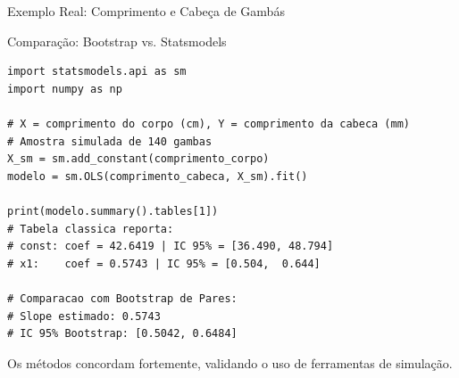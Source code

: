 \begin{frame}[fragile]{Exemplo Real: Comprimento e Cabeça de Gambás}
    \begin{block}{Comparação: Bootstrap vs. Statsmodels}
\begin{lstlisting}
import statsmodels.api as sm
import numpy as np

# X = comprimento do corpo (cm), Y = comprimento da cabeca (mm)
# Amostra simulada de 140 gambas
X_sm = sm.add_constant(comprimento_corpo)
modelo = sm.OLS(comprimento_cabeca, X_sm).fit()

print(modelo.summary().tables[1])
# Tabela classica reporta:
# const: coef = 42.6419 | IC 95% = [36.490, 48.794]
# x1:    coef = 0.5743 | IC 95% = [0.504,  0.644]

# Comparacao com Bootstrap de Pares:
# Slope estimado: 0.5743
# IC 95% Bootstrap: [0.5042, 0.6484]
\end{lstlisting}
    \end{block}
    \vspace{0.1cm}
    Os métodos concordam fortemente, validando o uso de ferramentas de simulação.
\end{frame}
